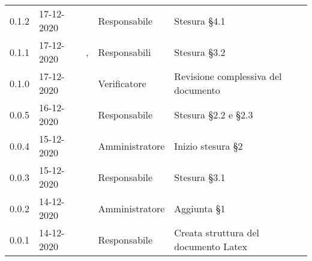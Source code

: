 {\begin{longtable}{C{1.7cm} C{2.5cm} C{3.2cm} C{2.7cm} C{4.8cm}}
0.1.2 & 17-12-2020 & \SG{} & Responsabile & Stesura \S 4.1 \\

0.1.1 & 17-12-2020 & \SG{},\newline \BM{} & Responsabili & Stesura \S 3.2 \\

0.1.0 & 17-12-2020 & \ZM{} & Verificatore & Revisione complessiva del documento \\

0.0.5 & 16-12-2020 & \BM{} & Responsabile & Stesura \S 2.2 e \S 2.3 \\
		
0.0.4 & 15-12-2020 & \PA{} & Amministratore & Inizio stesura \S 2 \\

0.0.3 & 15-12-2020 & \SG{} & Responsabile & Stesura \S 3.1 \\

0.0.2 & 14-12-2020 & \PA{} & Amministratore & Aggiunta \S 1 \\

0.0.1 & 14-12-2020 & \SG{} & Responsabile & Creata struttura del documento Latex \\
		
\end{longtable}
}
